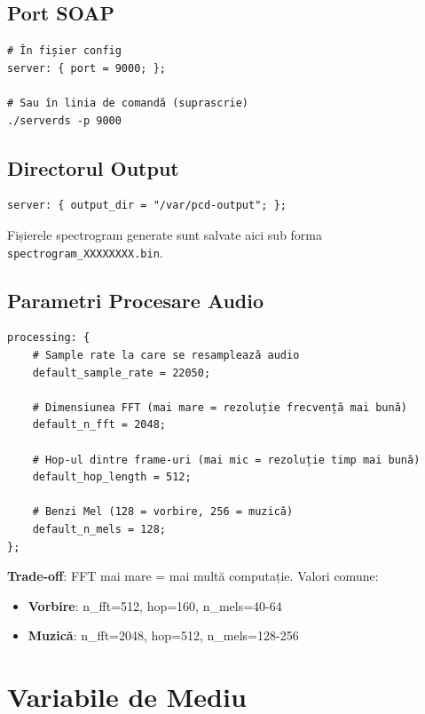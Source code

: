 \documentclass[12pt,a4paper,oneside]{book}
\newcommand{\warningbox}[1]{
\begin{tcolorbox}[colback=yellow!10,colframe=orange,title=\textbf{Atenție}]
#1
\end{tcolorbox}
}
\begin{document}
\subsection{Port SOAP}

\begin{lstlisting}
# În fișier config
server: { port = 9000; };

# Sau în linia de comandă (suprascrie)
./serverds -p 9000
\end{lstlisting}

\subsection{Directorul Output}

\begin{lstlisting}
server: { output_dir = "/var/pcd-output"; };
\end{lstlisting}

Fișierele spectrogram generate sunt salvate aici sub forma \texttt{spectrogram\_XXXXXXXX.bin}.

\subsection{Parametri Procesare Audio}

\begin{lstlisting}
processing: {
    # Sample rate la care se resamplează audio
    default_sample_rate = 22050;
    
    # Dimensiunea FFT (mai mare = rezoluție frecvență mai bună)
    default_n_fft = 2048;
    
    # Hop-ul dintre frame-uri (mai mic = rezoluție timp mai bună)
    default_hop_length = 512;
    
    # Benzi Mel (128 = vorbire, 256 = muzică)
    default_n_mels = 128;
};
\end{lstlisting}

\warningbox{
\textbf{Trade-off}: FFT mai mare = mai multă computație. Valori comune:
\begin{itemize}
    \item \textbf{Vorbire}: n\_fft=512, hop=160, n\_mels=40-64
    \item \textbf{Muzică}: n\_fft=2048, hop=512, n\_mels=128-256
\end{itemize}
}

\section{Variabile de Mediu}
\end{document}
